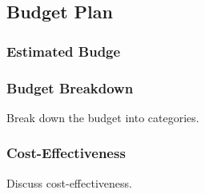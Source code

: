 \subsection{Budget Plan}
\subsubsection{Estimated Budge}

\subsubsection{Budget Breakdown}
Break down the budget into categories.

\subsubsection{Cost-Effectiveness}
Discuss cost-effectiveness.